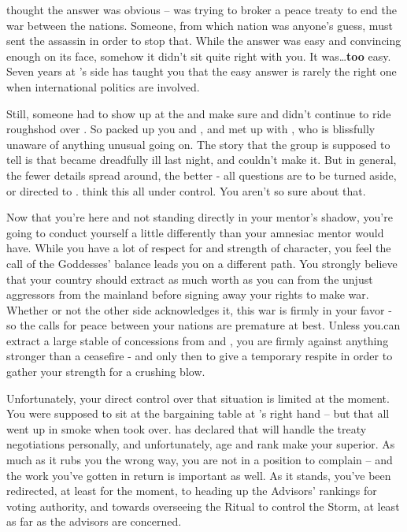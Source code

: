 \documentclass[char]{GL2020}
\begin{document}
\cEbbPriest{} thought the answer was obvious -- \cHeadDiplomat{} was trying to broker a peace treaty to end the war between the nations. Someone, from which nation was anyone’s guess, must sent the assassin in order to stop that. While the answer was easy and convincing enough on its face, somehow it didn’t sit quite right with you. It was\ldots \textbf{too} easy. Seven years at \cHeadDiplomat{}’s side has taught you that the easy answer is rarely the right one when international politics are involved.

Still, someone had to show up at the \pSchool{} and make sure \pTech{} and \pFarm{} didn’t continue to ride roughshod over \pShip{}. So \cEbbPriest{} packed up you and  \cChupLeader{}, and met up with \cBunker{}, who is blissfully unaware of anything unusual going on. The story that the group is supposed to tell is that \cHeadDiplomat{} became dreadfully ill last night, and couldn’t make it. But in general, the fewer details spread around, the better - all questions are to be turned aside, or directed to \cEbbPriest{}. \cEbbPriest{\They} think  \cEbbPriest{\have} this all under control. You aren’t so sure about that.

Now that you’re here and not standing directly in your mentor’s shadow, you’re going to conduct yourself a little differently than your amnesiac mentor would have. While you have a lot of respect for \cHeadDiplomat{} and \cHeadDiplomat{\their} strength of character, you feel the call of the Goddesses’ balance leads you on a different path. You strongly believe that your country should extract as much worth as you can from the unjust aggressors from the mainland before signing away your rights to make war. Whether or not the other side acknowledges it, this war is firmly in your favor - so the calls for peace between your nations are premature at best. Unless you.can extract a large stable of concessions from \pTech{} and \pFarm{}, you are firmly against anything stronger than a ceasefire - and only then to give a temporary respite in order to gather your strength for a crushing blow.

Unfortunately, your direct control over that situation is limited at the moment. You were supposed to sit at the bargaining table at \cHeadDiplomat{}’s right hand -- but that all went up in smoke when \cEbbPriest{} took over. \cEbbPriest{} has declared that \cEbbPriest{\they} will handle the treaty negotiations personally, and unfortunately, \cEbbPriest{\their} age and rank make \cEbbPriest{\them} your superior. As much as it rubs you the wrong way, you are not in a position to complain -- and the work you’ve gotten in return is important as well. As it stands, you’ve been redirected, at least for the moment, to heading up the Advisors’ rankings for voting authority, and towards overseeing the Ritual to control the Storm, at least as far as the \pShip{} advisors are concerned. 
\end{document}
